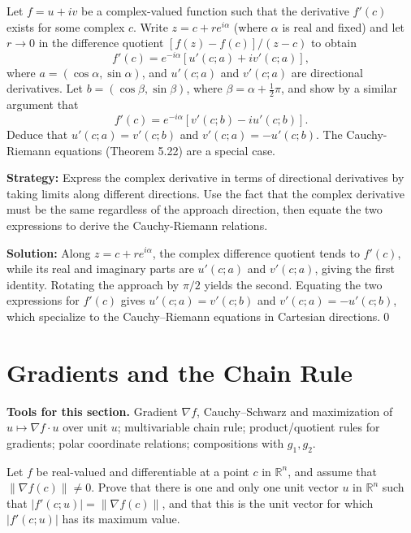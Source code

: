 \begin{problembox}
\begin{problemstatement}
Let \( f = u + iv \) be a complex-valued function such that the derivative \( f'(c) \) exists for some complex \( c \). Write \( z = c + re^{i\alpha} \) (where \( \alpha \) is real and fixed) and let \( r \to 0 \) in the difference quotient \( [f(z) - f(c)]/(z - c) \) to obtain
\[f'(c) = e^{-i\alpha}[u'(c; a) + iv'(c; a)],\]
where \( a = (\cos \alpha, \sin \alpha) \), and \( u'(c; a) \) and \( v'(c; a) \) are directional derivatives. Let \( b = (\cos \beta, \sin \beta) \), where \( \beta = \alpha + \frac{1}{2}\pi \), and show by a similar argument that
\[f'(c) = e^{-i\alpha}[v'(c; b) - iu'(c; b)].\]
Deduce that \( u'(c; a) = v'(c; b) \) and \( v'(c; a) = -u'(c; b) \). The Cauchy-Riemann equations (Theorem 5.22) are a special case.
\end{problemstatement}
\end{problembox}

\noindent\textbf{Strategy:} Express the complex derivative in terms of directional derivatives by taking limits along different directions. Use the fact that the complex derivative must be the same regardless of the approach direction, then equate the two expressions to derive the Cauchy-Riemann relations.

\bigskip\noindent\textbf{Solution:}
Along $z=c+re^{i\alpha}$, the complex difference quotient tends to $f'(c)$, while its real and imaginary parts are $u'(c;a)$ and $v'(c;a)$, giving the first identity. Rotating the approach by $\pi/2$ yields the second. Equating the two expressions for $f'(c)$ gives $u'(c;a)=v'(c;b)$ and $v'(c;a)=-u'(c;b)$, which specialize to the Cauchy–Riemann equations in Cartesian directions.\qed
\section{Gradients and the Chain Rule}

\noindent\textbf{Tools for this section.} Gradient $\nabla f$, Cauchy–Schwarz and maximization of $u\mapsto \nabla f\cdot u$ over unit $u$; multivariable chain rule; product/quotient rules for gradients; polar coordinate relations; compositions with $g_1,g_2$.



\begin{problembox}
\begin{problemstatement}
Let \( f \) be real-valued and differentiable at a point \( c \) in \( \mathbb{R}^n \), and assume that \( \| \nabla f(c) \| \neq 0 \). Prove that there is one and only one unit vector \( u \) in \( \mathbb{R}^n \) such that \( |f'(c; u)| = \| \nabla f(c) \| \), and that this is the unit vector for which \( |f'(c; u)| \) has its maximum value.
\end{problemstatement}
\end{problembox}

